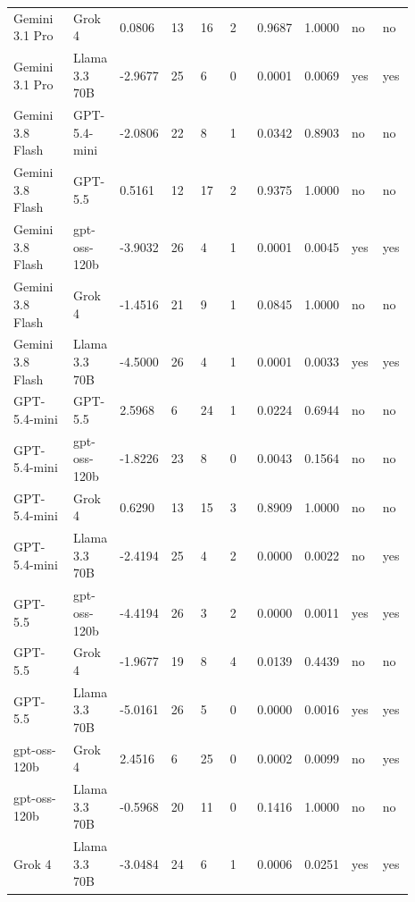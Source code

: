 \begin{landscape}
\begin{longtable}{p{0.162\linewidth}p{0.081\linewidth}p{0.081\linewidth}p{0.081\linewidth}p{0.081\linewidth}p{0.081\linewidth}p{0.081\linewidth}p{0.081\linewidth}p{0.081\linewidth}p{0.081\linewidth}}
Gemini 3.1 Pro & Grok 4 & 0.0806 & 13 & 16 & 2 & 0.9687 & 1.0000 & no & no \\
Gemini 3.1 Pro & Llama 3.3 70B & -2.9677 & 25 & 6 & 0 & 0.0001 & 0.0069 & yes & yes \\
Gemini 3.8 Flash & GPT-5.4-mini & -2.0806 & 22 & 8 & 1 & 0.0342 & 0.8903 & no & no \\
Gemini 3.8 Flash & GPT-5.5 & 0.5161 & 12 & 17 & 2 & 0.9375 & 1.0000 & no & no \\
Gemini 3.8 Flash & gpt-oss-120b & -3.9032 & 26 & 4 & 1 & 0.0001 & 0.0045 & yes & yes \\
Gemini 3.8 Flash & Grok 4 & -1.4516 & 21 & 9 & 1 & 0.0845 & 1.0000 & no & no \\
Gemini 3.8 Flash & Llama 3.3 70B & -4.5000 & 26 & 4 & 1 & 0.0001 & 0.0033 & yes & yes \\
GPT-5.4-mini & GPT-5.5 & 2.5968 & 6 & 24 & 1 & 0.0224 & 0.6944 & no & no \\
GPT-5.4-mini & gpt-oss-120b & -1.8226 & 23 & 8 & 0 & 0.0043 & 0.1564 & no & no \\
GPT-5.4-mini & Grok 4 & 0.6290 & 13 & 15 & 3 & 0.8909 & 1.0000 & no & no \\
GPT-5.4-mini & Llama 3.3 70B & -2.4194 & 25 & 4 & 2 & 0.0000 & 0.0022 & no & yes \\
GPT-5.5 & gpt-oss-120b & -4.4194 & 26 & 3 & 2 & 0.0000 & 0.0011 & yes & yes \\
GPT-5.5 & Grok 4 & -1.9677 & 19 & 8 & 4 & 0.0139 & 0.4439 & no & no \\
GPT-5.5 & Llama 3.3 70B & -5.0161 & 26 & 5 & 0 & 0.0000 & 0.0016 & yes & yes \\
gpt-oss-120b & Grok 4 & 2.4516 & 6 & 25 & 0 & 0.0002 & 0.0099 & no & yes \\
gpt-oss-120b & Llama 3.3 70B & -0.5968 & 20 & 11 & 0 & 0.1416 & 1.0000 & no & no \\
Grok 4 & Llama 3.3 70B & -3.0484 & 24 & 6 & 1 & 0.0006 & 0.0251 & yes & yes \\
\bottomrule
\end{longtable}
\normalsize
\end{landscape}
